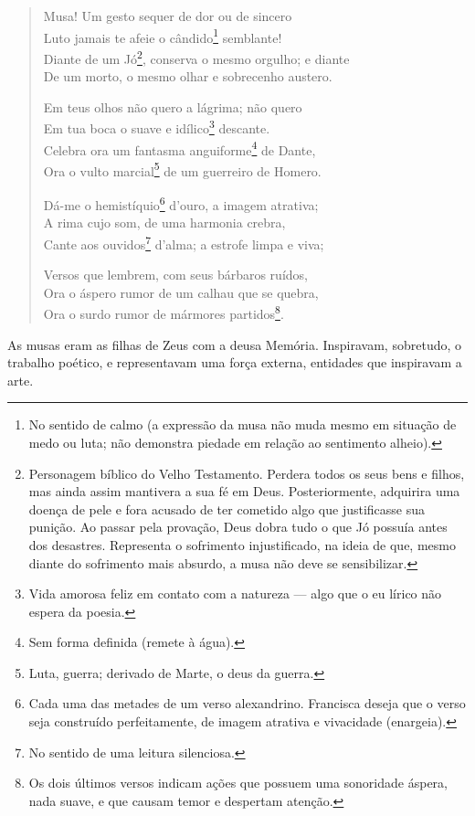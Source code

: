 \begin{verse}
Musa! Um gesto sequer de dor ou de sincero \\
Luto jamais te afeie o cândido\footnote{No sentido de calmo (a expressão da musa não muda mesmo em situação de medo ou luta; não demonstra piedade em relação ao sentimento alheio).} semblante! \\
Diante de um Jó\footnote{Personagem bíblico do Velho Testamento. Perdera todos os seus bens e filhos, mas ainda assim mantivera a sua fé em Deus. Posteriormente, adquirira uma doença de pele e fora acusado de ter cometido algo que justificasse sua punição. Ao passar pela provação, Deus dobra tudo o que Jó possuía antes dos desastres. Representa o sofrimento injustificado, na ideia de que, mesmo diante do sofrimento mais absurdo, a musa não deve se sensibilizar.}, conserva o mesmo orgulho; e diante \\
De um morto, o mesmo olhar e sobrecenho austero.

Em teus olhos não quero a lágrima; não quero \\
Em tua boca o suave e idílico\footnote{Vida amorosa feliz em contato com a natureza — algo que o eu lírico não espera da poesia.} descante. \\
Celebra ora um fantasma anguiforme\footnote{Sem forma definida (remete à água).} de Dante, \\
Ora o vulto marcial\footnote{Luta, guerra; derivado de Marte, o deus da guerra.} de um guerreiro de Homero.

Dá-me o hemistíquio\footnote{Cada uma das metades de um verso alexandrino. Francisca deseja que o verso seja construído perfeitamente, de imagem atrativa e vivacidade (enargeia).} d'ouro, a imagem atrativa; \\
A rima cujo som, de uma harmonia crebra, \\
Cante aos ouvidos\footnote{No sentido de uma leitura silenciosa.} d'alma; a estrofe limpa e viva;

Versos que lembrem, com seus bárbaros ruídos, \\
Ora o áspero rumor de um calhau que se quebra, \\
Ora o surdo rumor de mármores partidos\footnote{Os dois últimos versos indicam ações que possuem uma sonoridade áspera, nada suave, e que causam temor e despertam atenção.}.
\end{verse}

As musas eram as filhas de Zeus com a deusa Memória. Inspiravam, sobretudo, o trabalho poético, e representavam uma força externa, entidades que inspiravam a arte.

